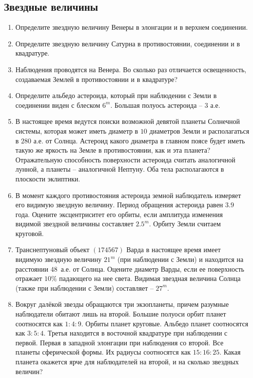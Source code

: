 \documentclass[12pt]{article}
\begin{document}
\subsection*{Звездные величины}
\begin{enumerate}[resume]
    \item Определите звездную величину Венеры в элонгации и в верхнем соединении.
    \item Определите звездную величину Сатурна в противостоянии, соединении и в квадратуре. 
    \item Наблюдения проводятся на Венера. Во сколько раз отличается освещенность, создаваемая Землей в противостоянии и в квадратуре?
    \item Определите альбедо астероида, который при наблюдении с Земли в соединении виден с блеском $6^m$. Большая полуось астероида -- $3$ а.е.
    \item В настоящее время ведутся поиски возможной девятой планеты Солнечной системы, которая может иметь диаметр в $10$ диаметров Земли и располагаться в $280$ а.е. от Солнца. Астероид какого диаметра в главном поясе будет иметь такую же яркость на Земле в противостоянии, как и эта планета? Отражательную способность поверхности астероида считать аналогичной лунной, а планеты -- аналогичной Нептуну. Оба тела располагаются в плоскости эклиптики.
    \item В момент каждого противостояния астероида земной наблюдатель измеряет его видимую звездную величину. Период обращения астероида равен $3.9$ года. Оцените эксцентриситет его орбиты, если амплитуда изменения видимой звездной величины составляет $2.5^m$. Орбиту Земли считаем круговой.
    \item Транснептуновый объект $(174567)$ Варда в настоящее время имеет видимую звездную	величину $21^m$ (при наблюдении с Земли) и находится на расстоянии $48$~а.е. от Солнца.	Оцените диаметр Варды, если ее поверхность отражает $10\%$ падающего на нее света. Видимая звездная величина Солнца (также при наблюдении с Земли) составляет -- $27^m$.
    \item Вокруг далёкой звезды обращаются три экзопланеты, причем разумные наблюдатели обитают лишь на второй. Большие полуоси орбит планет соотносятся как $1:4:9$. Орбиты планет круговые. Альбедо планет соотносятся как $3:5:4$. Третья находится в восточной квадратуре при наблюдении с первой. Первая в западной элонгации при наблюдения со второй. Все планеты сферической формы. Их радиусы соотносятся как $15:16:25$. Какая планета окажется ярче для наблюдателей на второй, и на сколько звездных величин?
\end{enumerate}
\end{document}
